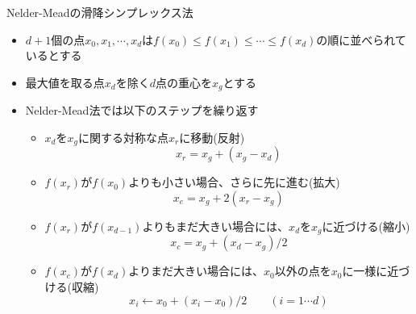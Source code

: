 \begin{frame}[t,fragile]{Nelder-Meadの滑降シンプレックス法}
  \begin{itemize}
  \item $d+1$個の点$x_0,x_1,\cdots,x_d$は$f(x_0) \le f(x_1) \le \cdots \le f(x_d)$の順に並べられているとする
  \item 最大値を取る点$x_d$を除く$d$点の重心を$x_g$とする
  \item Nelder-Mead法では以下のステップを繰り返す
    \begin{itemize}
    \item $x_d$を$x_g$に関する対称な点$x_r$に移動(反射)
      \[
      x_r = x_g + (x_g - x_d)
      \]
    \item $f(x_r)$が$f(x_0)$よりも小さい場合、さらに先に進む(拡大)
      \[
      x_e = x_g + 2(x_r - x_g)
      \]
    \item $f(x_r)$が$f(x_{d-1})$よりもまだ大きい場合には、$x_d$を$x_g$に近づける(縮小)
      \[
      x_c = x_g + (x_d-x_g)/2
      \]
    \item $f(x_c)$が$f(x_d)$よりまだ大きい場合には、$x_0$以外の点を$x_0$に一様に近づける(収縮)
      \[
      x_i \leftarrow x_0 + (x_i-x_0)/2 \qquad (i=1 \cdots d)
      \]
    \end{itemize}
  \end{itemize}
\end{frame}
